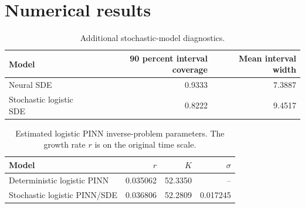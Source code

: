 \documentclass[11pt]{article}
\begin{document}
\section{Numerical results}

\begin{table}[htbp]
\centering
\caption{Model comparison on the original response scale. Lower RMSE, AIC, and
BIC are better; larger $R^2$ is better. The PINN AIC/BIC values use the same
Gaussian residual criterion as the other fitted mean curves.}
\label{tab:metrics}
\end{table}

\begin{table}[htbp]
\centering
\caption{Additional stochastic-model diagnostics.}
\begin{tabular}{lrr}
\toprule
Model & 90 percent interval coverage & Mean interval width \\
\midrule
Neural SDE & 0.9333 & 7.3887 \\
Stochastic logistic SDE & 0.8222 & 9.4517 \\
\bottomrule
\end{tabular}
\label{tab:sde-intervals}
\end{table}

\begin{table}[htbp]
\centering
\caption{Estimated logistic PINN inverse-problem parameters. The growth rate
$r$ is on the original time scale.}
\begin{tabular}{lrrr}
\toprule
Model & $r$ & $K$ & $\sigma$ \\
\midrule
Deterministic logistic PINN & 0.035062 & 52.3350 & -- \\
Stochastic logistic PINN/SDE & 0.036806 & 52.2809 & 0.017245 \\
\bottomrule
\end{tabular}
\label{tab:pinn-parameters}
\end{table}
\end{document}
